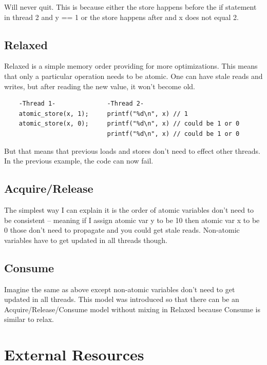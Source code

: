 Will never quit.
This is because either the store happens before the if statement in thread 2 and y == 1 or the store happens after and x does not equal 2.

\subsection{Relaxed}

Relaxed is a simple memory order providing for more optimizations.
This means that only a particular operation needs to be atomic.
One can have stale reads and writes, but after reading the new value, it won't become old.

\begin{verbatim}
    -Thread 1-              -Thread 2-
    atomic_store(x, 1);     printf("%d\n", x) // 1
    atomic_store(x, 0);     printf("%d\n", x) // could be 1 or 0
                            printf("%d\n", x) // could be 1 or 0
\end{verbatim}

But that means that previous loads and stores don't need to effect other threads.
In the previous example, the code can now fail.

\subsection{Acquire/Release}

The simplest way I can explain it is the order of atomic variables don't need to be consistent -- meaning if I assign atomic var y to be 10 then atomic var x to be 0 those don't need to propagate and you could get stale reads.
Non-atomic variables have to get updated in all threads though.

\subsection{Consume}

Imagine the same as above except non-atomic variables don't need to get updated in all threads.
This model was introduced so that there can be an Acquire/Release/Consume model without mixing in Relaxed because Consume is similar to relax.

\section{External Resources}

